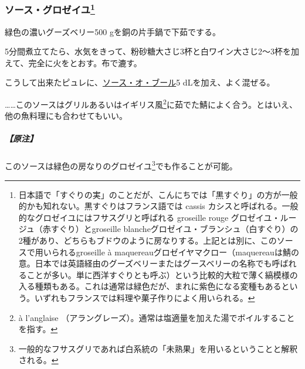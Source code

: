 \begin{recette}
\atoaki{}

\hypertarget{sauce-groseilles}{%
\subsubsection[ソース・グロゼイユ]{\texorpdfstring{ソース・グロゼイユ\footnote{日本語で「すぐりの実」のことだが、こんにちでは「黒すぐり」の方が一般的かも知れない。黒すぐりはフランス語では
  cassis カシスと呼ばれる。一般的なグロゼイユにはフサスグリと呼ばれる
  groseille rouge グロゼイユ・ルージュ（赤すぐり）とgroseille
  blancheグロゼイユ・ブランシュ（白すぐり）の2種があり、どちらもブドウのように房なりする。上記とは別に、このソースで用いられるgroseille
  à
  maquereauグロゼイヤマクロー（maquereauは鯖の意。日本では英語経由のグーズベリーまたはグースベリーの名称でも呼ばれることが多い。単に西洋すぐりとも呼ぶ）という比較的大粒で薄く縞模様の入る種類もある。これは通常は緑色だが、まれに紫色になる変種もあるという。いずれもフランスでは料理や菓子作りによく用いられる。}}{ソース・グロゼイユ}}\label{sauce-groseilles}}


 

緑色の濃いグーズベリー500 gを銅の片手鍋で下茹でする。

5分間煮立てたら、水気をきって、粉砂糖大さじ3杯と白ワイン大さじ2〜3杯を加えて、完全に火をとおす。布で漉す。

こうして出来たピュレに、\protect\hyperlink{sauce-au-beurre}{ソース・オ・ブール}5
dLを加え、よく混ぜる。

\ldots{}\ldots{}このソースはグリルあるいはイギリス風\footnote{à
  l'anglaise
  （アラングレーズ）。通常は塩適量を加えた湯でボイルすることを指す。}に茹でた鯖によく合う。とはいえ、他の魚料理にも合わせてもいい。

\hypertarget{nota-sauce-groseiles}{%
\subparagraph{【原注】}\label{nota-sauce-groseiles}}

このソースは緑色の房なりのグロゼイユ\footnote{一般的なフサスグリであれば白系統の「未熟果」を用いるということと解釈される。}でも作ることが可能。

\atoaki{}

\hypertarget{sauce-hollandaise}{%
}
\end{recette}
